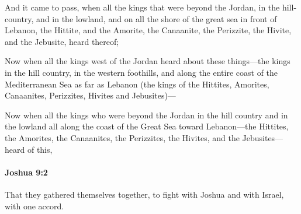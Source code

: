 			\begin{versebox}
					\item[BHS] 
					\item[ASV] And it came to pass, when all the kings that were beyond the Jordan, in the hill-country, and in the lowland, and on all the shore of the great sea in front of Lebanon, the Hittite, and the Amorite, the Canaanite, the Perizzite, the Hivite, and the Jebusite, heard thereof;
					\item[NIV] Now when all the kings west of the Jordan heard about these things—the kings in the hill country, in the western foothills, and along the entire coast of the Mediterranean Sea as far as Lebanon (the kings of the Hittites, Amorites, Canaanites, Perizzites, Hivites and Jebusites)—
					\item[NRSV] Now when all the kings who were beyond the Jordan in the hill country and in the lowland all along the coast of the Great Sea toward Lebanon—the Hittites, the Amorites, the Canaanites, the Perizzites, the Hivites, and the Jebusites—heard of this,
			\end{versebox}

		\paragraph{Joshua 9:2} %
			\label{JOSHUA-9-2}

			That they gathered themselves together, to fight with Joshua and with Israel, with one accord.

